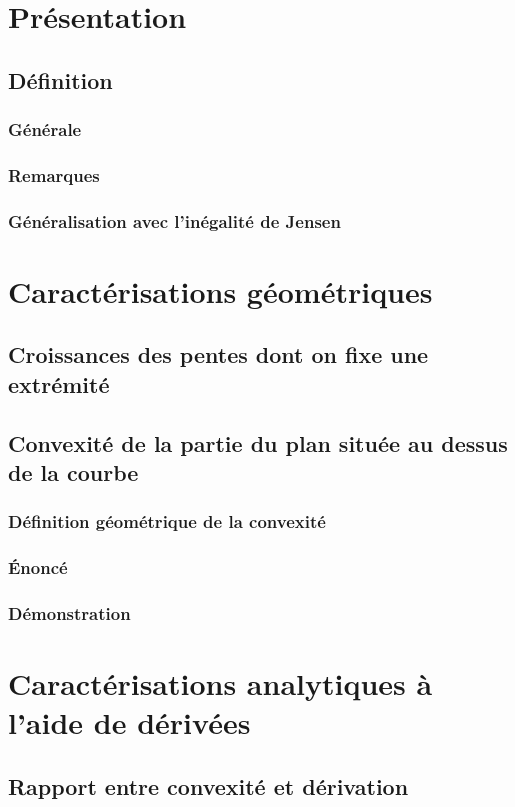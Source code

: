 \documentclass[12pt,a4paper,french]{book}
\begin{document}
	\section{Présentation}
		\subsection{Définition}
			\subsubsection{Générale}
			\subsubsection{Remarques}
			\subsubsection{Généralisation avec l'inégalité de Jensen}
	\section{Caractérisations géométriques}
		\subsection{Croissances des pentes dont on fixe une extrémité}
		\subsection{Convexité de la partie du plan située au dessus de la courbe}
			\subsubsection{Définition géométrique de la convexité}
			\subsubsection{Énoncé}
			\subsubsection{Démonstration}
	\section{Caractérisations analytiques à l'aide de dérivées}
		\subsection{Rapport entre convexité et dérivation}
\end{document}
